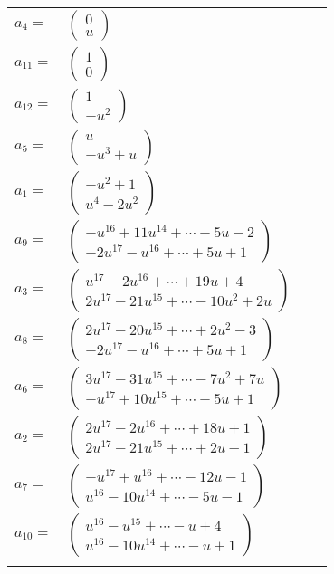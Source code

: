 \documentclass[1p]{elsarticle_modified}
\theoremstyle{definition}
\begin{document}
\begin{tabular}{m{7pt} m{180pt} m{7pt} m{180pt} }
\flushright $a_{4}=$&$\begin{pmatrix}0\\u\end{pmatrix}$ \\
\flushright $a_{11}=$&$\begin{pmatrix}1\\0\end{pmatrix}$ \\
\flushright $a_{12}=$&$\begin{pmatrix}1\\- u^2\end{pmatrix}$ \\
\flushright $a_{5}=$&$\begin{pmatrix}u\\- u^3+u\end{pmatrix}$ \\
\flushright $a_{1}=$&$\begin{pmatrix}- u^2+1\\u^4-2 u^2\end{pmatrix}$ \\
\flushright $a_{9}=$&$\begin{pmatrix}- u^{16}+11 u^{14}+\cdots+5 u-2\\-2 u^{17}- u^{16}+\cdots+5 u+1\end{pmatrix}$ \\
\flushright $a_{3}=$&$\begin{pmatrix}u^{17}-2 u^{16}+\cdots+19 u+4\\2 u^{17}-21 u^{15}+\cdots-10 u^2+2 u\end{pmatrix}$ \\
\flushright $a_{8}=$&$\begin{pmatrix}2 u^{17}-20 u^{15}+\cdots+2 u^2-3\\-2 u^{17}- u^{16}+\cdots+5 u+1\end{pmatrix}$ \\
\flushright $a_{6}=$&$\begin{pmatrix}3 u^{17}-31 u^{15}+\cdots-7 u^2+7 u\\- u^{17}+10 u^{15}+\cdots+5 u+1\end{pmatrix}$ \\
\flushright $a_{2}=$&$\begin{pmatrix}2 u^{17}-2 u^{16}+\cdots+18 u+1\\2 u^{17}-21 u^{15}+\cdots+2 u-1\end{pmatrix}$ \\
\flushright $a_{7}=$&$\begin{pmatrix}- u^{17}+u^{16}+\cdots-12 u-1\\u^{16}-10 u^{14}+\cdots-5 u-1\end{pmatrix}$ \\
\flushright $a_{10}=$&$\begin{pmatrix}u^{16}- u^{15}+\cdots- u+4\\u^{16}-10 u^{14}+\cdots- u+1\end{pmatrix}$\\&\end{tabular}
\end{document}
